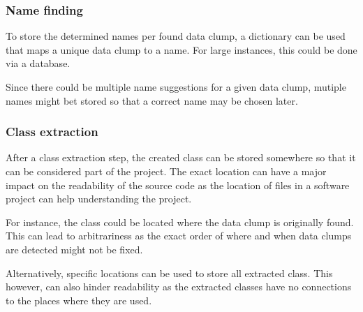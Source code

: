\subsubsection{Name finding}
To store the determined names per found data clump, a dictionary can be used that maps a unique data clump to a name. For large instances, this could be done via a database. 

Since  there could be multiple name suggestions for a given data clump, mutiple names might bet stored so that a correct name may be chosen later.

\subsubsection{Class extraction}

After a class extraction step, the created class can be stored somewhere so that it can be considered part of the project. The exact location can have a major impact on the readability of the source code as the location of files in a software project can help understanding the project. 

For instance, the class could be located where the data clump is originally found. This can lead to arbitrariness  as the exact order of where and when data clumps are detected might not be fixed. 

Alternatively, specific locations can be used to store all extracted class. This however, can also hinder readability as the extracted classes have no connections to the places where they are used.  

